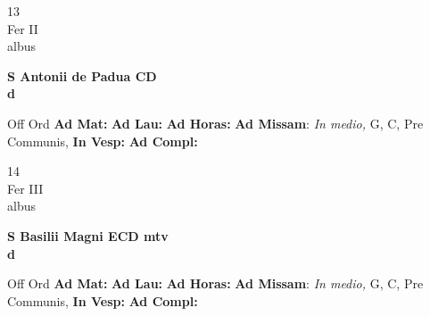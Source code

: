 \documentclass[10pt, openany]{book}
\begin{document}
        \begin{center}
            \begin{minipage}{3.5in}
                \vspace{2em}
                \begin{minipage}{0.5in}
                    {\Huge 13} \\
                    {\normalsize Fer II} \\
                    {\normalsize albus}
                \end{minipage}
                \begin{minipage}{3.0in}
                    \textbf{ \large S Antonii de Padua CD \\
                    \textnormal{\normalsize d}} \\ 
                \end{minipage}
                \begin{justify}Off Ord
                    \textbf{Ad Mat: }
                    \textbf{Ad Lau: }
                    \textbf{Ad Horas: }\textbf{Ad Missam}: \textit{In medio,} G, C, Pre Communis,  
                    \textbf{In Vesp: }
                    \textbf{Ad Compl: }
                \end{justify}
            \end{minipage}
        \end{center}
    
        \begin{center}
            \begin{minipage}{3.5in}
                \vspace{2em}
                \begin{minipage}{0.5in}
                    {\Huge 14} \\
                    {\normalsize Fer III} \\
                    {\normalsize albus}
                \end{minipage}
                \begin{minipage}{3.0in}
                    \textbf{ \large S Basilii Magni ECD mtv \\
                    \textnormal{\normalsize d}} \\ 
                \end{minipage}
                \begin{justify}Off Ord
                    \textbf{Ad Mat: }
                    \textbf{Ad Lau: }
                    \textbf{Ad Horas: }\textbf{Ad Missam}: \textit{In medio,} G, C, Pre Communis,  
                    \textbf{In Vesp: }
                    \textbf{Ad Compl: }
                \end{justify}
            \end{minipage}
        \end{center}
    
\end{document}
